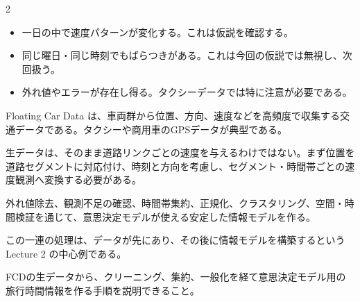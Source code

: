 \begin{multicols}{2}

\footnotesize

\raggedcolumns


\begin{itemize}
\item 一日の中で速度パターンが変化する。これは仮説を確認する。
\item 同じ曜日・同じ時刻でもばらつきがある。これは今回の仮説では無視し、次回扱う。
\item 外れ値やエラーが存在し得る。タクシーデータでは特に注意が必要である。
\end{itemize}

Floating Car Data は、車両群から位置、方向、速度などを高頻度で収集する交通データである。タクシーや商用車のGPSデータが典型である。\par

生データは、そのまま道路リンクごとの速度を与えるわけではない。まず位置を道路セグメントに対応付け、時刻と方向を考慮し、セグメント・時間帯ごとの速度観測へ変換する必要がある。\par

外れ値除去、観測不足の確認、時間帯集約、正規化、クラスタリング、空間・時間検証を通じて、意思決定モデルが使える安定した情報モデルを作る。\par

この一連の処理は、データが先にあり、その後に情報モデルを構築するという Lecture 2 の中心例である。\par

FCDの生データから、クリーニング、集約、一般化を経て意思決定モデル用の旅行時間情報を作る手順を説明できること。\par



\end{multicols}
